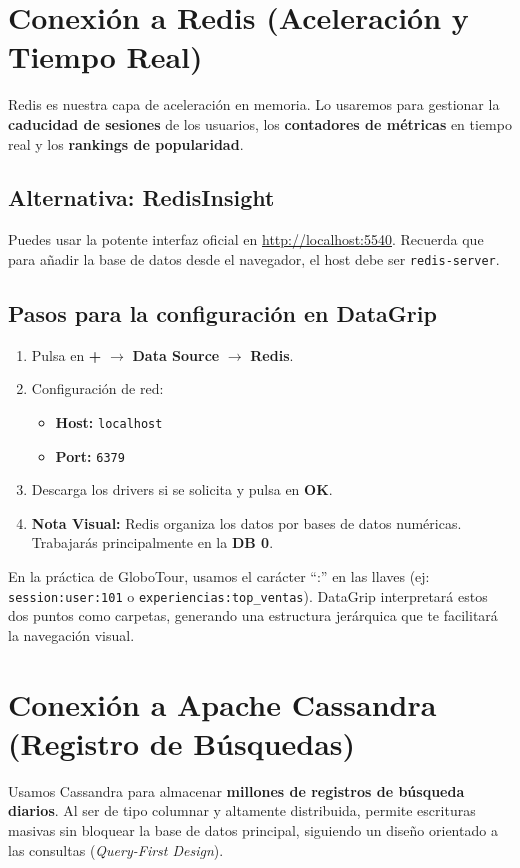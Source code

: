 \documentclass[12pt,a4paper]{article}
\begin{document}
\section{Conexión a Redis (Aceleración y Tiempo Real)}
Redis es nuestra capa de aceleración en memoria. Lo usaremos para gestionar la \textbf{caducidad de sesiones} de los usuarios, los \textbf{contadores de métricas} en tiempo real y los \textbf{rankings de popularidad}.

\subsection{Alternativa: RedisInsight}
Puedes usar la potente interfaz oficial en \url{http://localhost:5540}. Recuerda que para añadir la base de datos desde el navegador, el host debe ser \texttt{redis-server}.

\subsection{Pasos para la configuración en DataGrip}
\begin{enumerate}
    \item Pulsa en \textbf{+} $\rightarrow$ \textbf{Data Source} $\rightarrow$ \textbf{Redis}.
    \item Configuración de red:
    \begin{itemize}
        \item \textbf{Host:} \texttt{localhost}
        \item \textbf{Port:} \texttt{6379}
    \end{itemize}
    \item Descarga los drivers si se solicita y pulsa en \textbf{OK}.
    \item \textbf{Nota Visual:} Redis organiza los datos por bases de datos numéricas. Trabajarás principalmente en la \textbf{DB 0}.
\end{enumerate}

\begin{tcolorbox}[title=Consejo de Productividad: Jerarquía Visual]
En la práctica de GloboTour, usamos el carácter \enquote{:} en las llaves (ej: \texttt{session:user:101} o \texttt{experiencias:top\_ventas}). DataGrip interpretará estos dos puntos como carpetas, generando una estructura jerárquica que te facilitará la navegación visual.
\end{tcolorbox}

\section{Conexión a Apache Cassandra (Registro de Búsquedas)}
Usamos Cassandra para almacenar \textbf{millones de registros de búsqueda diarios}. Al ser de tipo columnar y altamente distribuida, permite escrituras masivas sin bloquear la base de datos principal, siguiendo un diseño orientado a las consultas (\textit{Query-First Design}).
\end{document}
